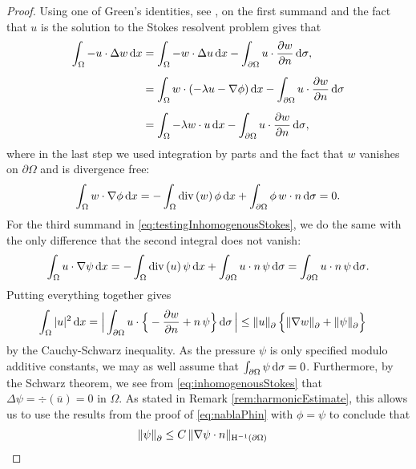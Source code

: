 \begin{proof}
  Using one of Green's identities, see \cite[Thm.\@~3, App.\@~C.2]{evans}, on the first summand and the fact that $u$ is the solution to the Stokes resolvent problem gives that
  \begin{align*}
    \int_\Omega -u \cdot \Delta w \, {\operatorname{d}\!{x}}
    &= \int_\Omega -w \cdot \Delta u \, {\operatorname{d}\!{x}} - \int_{\partial\Omega} u \cdot \frac{\partial w}{\partial n} \, {\operatorname{d}\!{\sigma}}, \\[0.5em]
    &= \int_\Omega w \cdot ( -\lambda u - \nabla \phi) \, {\operatorname{d}\!{x}} - \int_{\partial\Omega} u \cdot \frac{\partial w}{\partial n} \, {\operatorname{d}\!{\sigma}} \\[0.5em]
    &= \int_\Omega -\lambda w \cdot u \, {\operatorname{d}\!{x}} - \int_{\partial\Omega} u \cdot \frac{\partial w}{\partial n} \, {\operatorname{d}\!{\sigma}}, 
  \end{align*}
  where in the last step we used integration by parts and the fact that $w$ vanishes on $\partial\Omega$ and is divergence free:
  \begin{align*}
    \int_\Omega w \cdot \nabla\phi \, {\operatorname{d}\!{x}} = -\int_\Omega \mathrm{div\,} (w) \, \phi \, {\operatorname{d}\!{x}} + \int_{\partial\Omega} \phi \, w \cdot n \, {\operatorname{d}\!{\sigma}} = 0.
  \end{align*}
  For the third summand in \eqref{eq:testingInhomogenousStokes}, we do the same with the only difference that the second integral does not vanish:
  \begin{align*}
    \int_\Omega u \cdot \nabla\psi \, {\operatorname{d}\!{x}} 
    = -\int_\Omega \mathrm{div\,} (u)\, \psi \, {\operatorname{d}\!{x}} + \int_{\partial\Omega} u \cdot n\, \psi \, {\operatorname{d}\!{\sigma}} 
    = \int_{\partial\Omega} u \cdot n  \,\psi \, {\operatorname{d}\!{\sigma}}.
  \end{align*}
  Putting everything together gives
  \begin{align}
    \int_\Omega |u|^2 \, {\operatorname{d}\!{x}} 
    &= \Big| \int_{\partial\Omega} u \cdot \Big\{ - \frac{\partial w}{\partial n} + n\, \psi \Big\} \, {\operatorname{d}\!{\sigma}}\, \Big|
    \leq \| u\|^{}_\partial \, \Big\{ \|\nabla w\|^{}_\partial + \|\psi\|^{}_\partial \Big\} \label{eq:u2estimate}
  \end{align}
  by the Cauchy-Schwarz inequality.
  As the pressure $\psi$ is only specified modulo additive constants, we may as well assume that $\int_{\partial\Omega} \psi \, {\operatorname{d}\!{\sigma}} = 0$.
  Furthermore, by the Schwarz theorem, we see from \eqref{eq:inhomogenousStokes} that $\Delta \psi = \div(\overline u) = 0$ in $\Omega$. 
  As stated in Remark \ref{rem:harmonicEstimate}, this allows us to use the results from the proof of \eqref{eq:nablaPhin} with $\phi = \psi$ to conclude that
  \begin{align}
      \|\psi\|^{}_\partial 
    &\leq C\, \| \nabla \psi \cdot n\|_{\HH^{-1}(\partial\Omega)} \nonumber

\end{align}
\end{proof}
